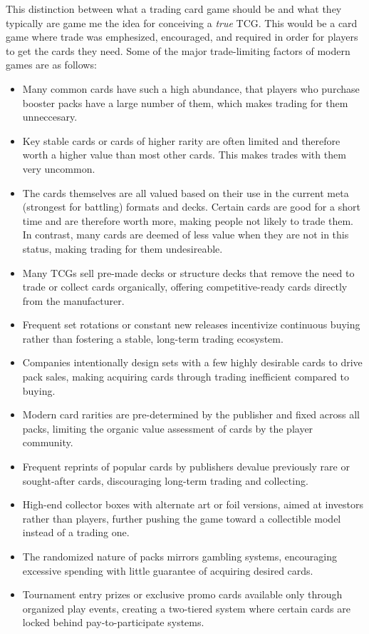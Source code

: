 This distinction between what a trading card game should be and what they typically are game me the idea for conceiving a \textit{true} TCG. This would be a card game where trade was emphesized, encouraged, and required in order for players to get the cards they need. Some of the major trade-limiting factors of modern games are as follows:
\begin{itemize}
	\item Many common cards have such a high abundance, that players who purchase booster packs have a large number of them, which makes trading for them unneccesary.
 	\item Key stable cards or cards of higher rarity are often limited and therefore worth a higher value than most other cards. This makes trades with them very uncommon.
  	\item The cards themselves are all valued based on their use in the current meta (strongest for battling) formats and decks. Certain cards are good for a short time and are therefore worth more, making people not likely to trade them. In contrast, many cards are deemed of less value when they are not in this status, making trading for them undesireable.
	\item Many TCGs sell pre-made decks or structure decks that remove the need to trade or collect cards organically, offering competitive-ready cards directly from the manufacturer.
 	\item Frequent set rotations or constant new releases incentivize continuous buying rather than fostering a stable, long-term trading ecosystem.
  	\item Companies intentionally design sets with a few highly desirable cards to drive pack sales, making acquiring cards through trading inefficient compared to buying.
   	\item Modern card rarities are pre-determined by the publisher and fixed across all packs, limiting the organic value assessment of cards by the player community.
    	\item Frequent reprints of popular cards by publishers devalue previously rare or sought-after cards, discouraging long-term trading and collecting.
     	\item High-end collector boxes with alternate art or foil versions, aimed at investors rather than players, further pushing the game toward a collectible model instead of a trading one.
      	\item The randomized nature of packs mirrors gambling systems, encouraging excessive spending with little guarantee of acquiring desired cards.
        \item Tournament entry prizes or exclusive promo cards available only through organized play events, creating a two-tiered system where certain cards are locked behind pay-to-participate systems.
\end{itemize}










